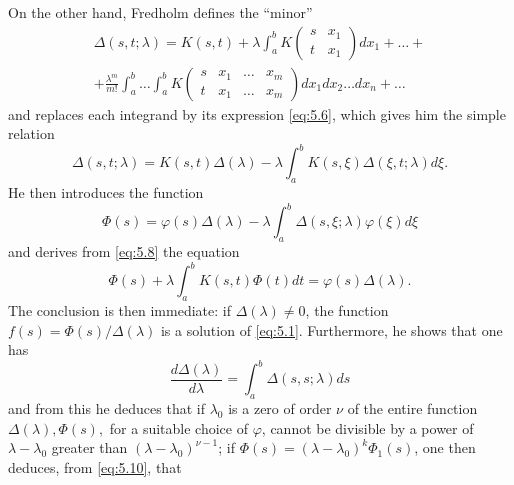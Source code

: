 \documentclass[12pt,a4paper,leqno,twoside]{extbook}
\begin{document}
On the other hand, Fredholm defines the ``minor''
\begin{equation}
    \label{eq:5.7}
    \begin{gathered}
        \Delta(s, t; \lambda) = K(s, t) + \lambda \int_a^b K
        \left(
        \begin{matrix}
            s & x_1 \\
            t & x_1
        \end{matrix}
        \right)
        dx_1 + \ldots + \\
        + \frac{\lambda^m}{m!} \int_a^b \ldots \int_a^b K
        \left(
        \begin{matrix}
            s & x_1 & \ldots & x_m \\
            t & x_1 & \ldots & x_m
        \end{matrix}
        \right)
        dx_1 dx_2 \ldots dx_n + \ldots
    \end{gathered}
\end{equation}
and replaces each integrand by its expression \eqref{eq:5.6}, which gives him the simple relation
\begin{equation}
    \label{eq:5.8}
    \Delta(s, t; \lambda) = K(s, t)\Delta(\lambda) - \lambda \int_a^b K(s, \xi) \Delta(\xi, t; \lambda) d\xi.
\end{equation}
He then introduces the function
\begin{equation}
    \label{eq:5.9}
    \Phi(s) = \varphi(s)\Delta(\lambda) - \lambda \int_a^b \Delta(s, \xi; \lambda) \varphi(\xi) d\xi
\end{equation}
and derives from \eqref{eq:5.8} the equation
\begin{equation}
    \label{eq:5.10}
    \Phi(s) + \lambda \int_a^b K(s, t)\Phi(t)dt = \varphi(s)\Delta(\lambda).
\end{equation}
The conclusion is then immediate: if \(\Delta(\lambda) \neq 0\), the function \(f(s) = \Phi(s)/\Delta(\lambda)\) is a solution of \eqref{eq:5.1}. Furthermore, he shows that one has
\begin{equation}
    \label{eq:5.11}
    \frac{d\Delta(\lambda)}{d\lambda} = \int_a^b \Delta(s, s; \lambda)ds
\end{equation}
and from this he deduces that if \(\lambda_0\) is a zero of order \(\nu\)  of the entire function \(\Delta(\lambda), \Phi(s),\) for a suitable choice of \(\varphi\), cannot be divisible by a power of \(\lambda - \lambda_0\) greater than \((\lambda - \lambda_0)^{\nu-1}\); if \(\Phi(s) = (\lambda - \lambda_0)^k \Phi_1(s)\), one then deduces, from \eqref{eq:5.10}, that
\end{document}
